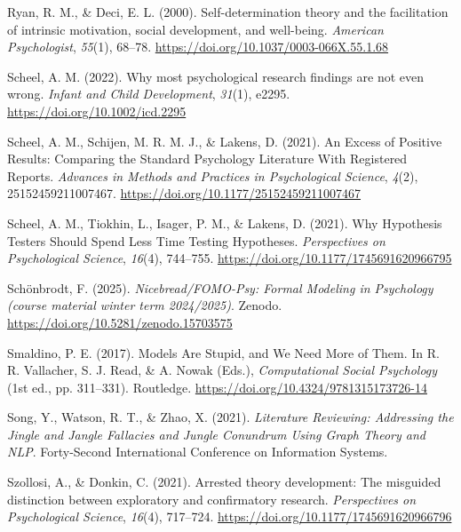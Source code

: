 \documentclass[
  man, noextraspace,floatsintext]{apa7}
\newlength{\cslhangindent}
\newenvironment{CSLReferences}[2] %
 {\begin{list}{}{%
  \setlength{\itemindent}{0pt}
  \setlength{\leftmargin}{0pt}
  \setlength{\parsep}{0pt}
  \ifodd #1
   \setlength{\leftmargin}{\cslhangindent}
   \setlength{\itemindent}{-1\cslhangindent}
  \fi
  \setlength{\itemsep}{#2\baselineskip}}}
 {\end{list}}
\begin{document}
\begin{CSLReferences}{1}{0}
Ryan, R. M., \& Deci, E. L. (2000). Self-determination theory and the facilitation of intrinsic motivation, social development, and well-being. \emph{American Psychologist}, \emph{55}(1), 68--78. \url{https://doi.org/10.1037/0003-066X.55.1.68}

Scheel, A. M. (2022). Why most psychological research findings are not even wrong. \emph{Infant and Child Development}, \emph{31}(1), e2295. \url{https://doi.org/10.1002/icd.2295}

Scheel, A. M., Schijen, M. R. M. J., \& Lakens, D. (2021). An {Excess} of {Positive Results}: {Comparing} the {Standard Psychology Literature With Registered Reports}. \emph{Advances in Methods and Practices in Psychological Science}, \emph{4}(2), 25152459211007467. \url{https://doi.org/10.1177/25152459211007467}

Scheel, A. M., Tiokhin, L., Isager, P. M., \& Lakens, D. (2021). Why {Hypothesis Testers Should Spend Less Time Testing Hypotheses}. \emph{Perspectives on Psychological Science}, \emph{16}(4), 744--755. \url{https://doi.org/10.1177/1745691620966795}

Schönbrodt, F. (2025). \emph{Nicebread/{FOMO-Psy}: {Formal Modeling} in {Psychology} (course material winter term 2024/2025)}. Zenodo. \url{https://doi.org/10.5281/zenodo.15703575}

Smaldino, P. E. (2017). Models {Are Stupid}, and {We Need More} of {Them}. In R. R. Vallacher, S. J. Read, \& A. Nowak (Eds.), \emph{Computational {Social Psychology}} (1st ed., pp. 311--331). Routledge. \url{https://doi.org/10.4324/9781315173726-14}

Song, Y., Watson, R. T., \& Zhao, X. (2021). \emph{Literature {Reviewing}: {Addressing} the {Jingle} and {Jangle Fallacies} and {Jungle Conundrum Using Graph Theory} and {NLP}}. Forty-{Second International Conference} on {Information Systems}.

Szollosi, A., \& Donkin, C. (2021). Arrested theory development: {The} misguided distinction between exploratory and confirmatory research. \emph{Perspectives on Psychological Science}, \emph{16}(4), 717--724. \url{https://doi.org/10.1177/1745691620966796}


\end{CSLReferences}
\end{document}
